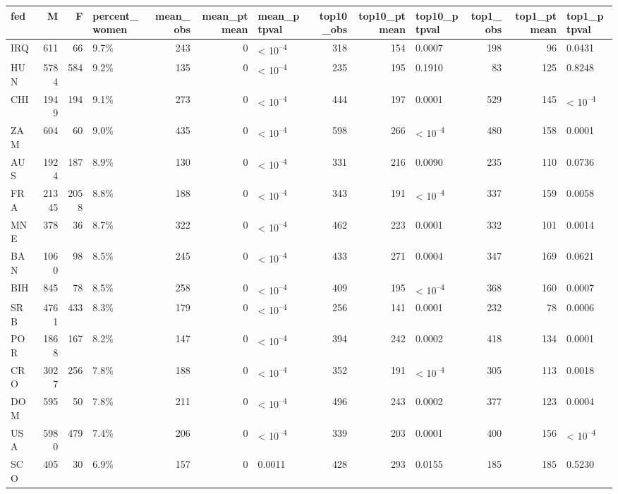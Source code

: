 
\begin{tabular}{l|r|r|l|r|r|l|r|r|l|r|r|l}
\hline
fed & M & F & percent_women & mean_obs & mean_ptmean & mean_ptpval & top10_obs & top10_ptmean & top10_ptpval & top1_obs & top1_ptmean & top1_ptpval\\
\hline
IRQ & 611 & 66 & 9.7\% & 243 & 0 & < 10\textsuperscript{--4} & 318 & 154 & 0.0007 & 198 & 96 & 0.0431\\
\hline
HUN & 5784 & 584 & 9.2\% & 135 & 0 & < 10\textsuperscript{--4} & 235 & 195 & 0.1910 & 83 & 125 & 0.8248\\
\hline
CHI & 1949 & 194 & 9.1\% & 273 & 0 & < 10\textsuperscript{--4} & 444 & 197 & 0.0001 & 529 & 145 & < 10\textsuperscript{--4}\\
\hline
ZAM & 604 & 60 & 9.0\% & 435 & 0 & < 10\textsuperscript{--4} & 598 & 266 & < 10\textsuperscript{--4} & 480 & 158 & 0.0001\\
\hline
AUS & 1924 & 187 & 8.9\% & 130 & 0 & < 10\textsuperscript{--4} & 331 & 216 & 0.0090 & 235 & 110 & 0.0736\\
\hline
FRA & 21345 & 2058 & 8.8\% & 188 & 0 & < 10\textsuperscript{--4} & 343 & 191 & < 10\textsuperscript{--4} & 337 & 159 & 0.0058\\
\hline
MNE & 378 & 36 & 8.7\% & 322 & 0 & < 10\textsuperscript{--4} & 462 & 223 & 0.0001 & 332 & 101 & 0.0014\\
\hline
BAN & 1060 & 98 & 8.5\% & 245 & 0 & < 10\textsuperscript{--4} & 433 & 271 & 0.0004 & 347 & 169 & 0.0621\\
\hline
BIH & 845 & 78 & 8.5\% & 258 & 0 & < 10\textsuperscript{--4} & 409 & 195 & < 10\textsuperscript{--4} & 368 & 160 & 0.0007\\
\hline
SRB & 4761 & 433 & 8.3\% & 179 & 0 & < 10\textsuperscript{--4} & 256 & 141 & 0.0001 & 232 & 78 & 0.0006\\
\hline
POR & 1868 & 167 & 8.2\% & 147 & 0 & < 10\textsuperscript{--4} & 394 & 242 & 0.0002 & 418 & 134 & 0.0001\\
\hline
CRO & 3027 & 256 & 7.8\% & 188 & 0 & < 10\textsuperscript{--4} & 352 & 191 & < 10\textsuperscript{--4} & 305 & 113 & 0.0018\\
\hline
DOM & 595 & 50 & 7.8\% & 211 & 0 & < 10\textsuperscript{--4} & 496 & 243 & 0.0002 & 377 & 123 & 0.0004\\
\hline
USA & 5980 & 479 & 7.4\% & 206 & 0 & < 10\textsuperscript{--4} & 339 & 203 & 0.0001 & 400 & 156 & < 10\textsuperscript{--4}\\
\hline
SCO & 405 & 30 & 6.9\% & 157 & 0 & 0.0011 & 428 & 293 & 0.0155 & 185 & 185 & 0.5230\\

\end{tabular}
